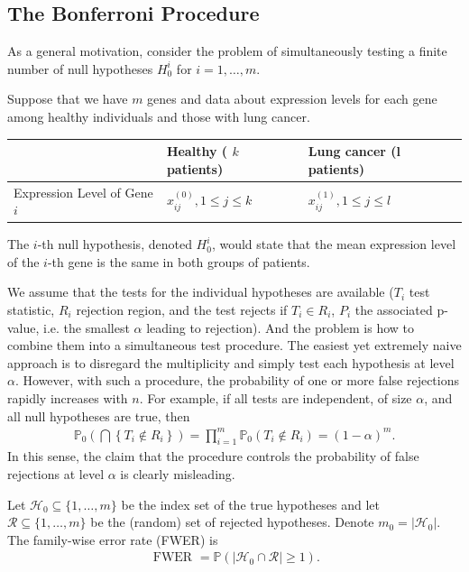 \subsection{The Bonferroni Procedure}
As a general motivation, consider the problem of simultaneously testing a finite number of null hypotheses $H_0^i$ for $i=1, \ldots, m$.
\begin{eg}
    Suppose that we have $m$ genes and data about expression levels for each gene among healthy individuals and those with lung cancer.
    
\begin{tabular}{l|l|l} 
& Healthy ( $k$ patients) & Lung cancer (l patients) \\
\hline Expression Level of Gene $i$ & $x_{i j}^{(0)}, 1 \leq j \leq k$ & $x_{i j}^{(1)}, 1 \leq j \leq l$
\end{tabular}

The $i$-th null hypothesis, denoted $H_0^i$, would state that the mean expression level of the $i$-th gene is the same in both groups of patients.
\end{eg}


We assume that the tests for the individual hypotheses are available ($T_i$ test statistic, $R_i$ rejection region, and the test rejects if $T_i \in R_i$, $P_i$ the associated p-value, i.e. the smallest $\alpha$ leading to rejection). And the problem is how to combine them into a simultaneous test procedure. The easiest yet extremely naive approach is to disregard the multiplicity and simply test each hypothesis at level $\alpha$. However, with such a procedure, the probability of one or more false rejections rapidly increases with $n$. For example, if all tests are independent, of size $\alpha$, and all null hypotheses are true, then
\begin{align*}
\mathbb{P}_0\left(\bigcap\left\{T_i \notin R_i\right\}\right)=\prod_{i=1}^m \mathbb{P}_0\left(T_i \notin R_i\right)=(1-\alpha)^m .
\end{align*}
In this sense, the claim that the procedure controls the probability of false rejections at level $\alpha$ is clearly misleading.
\begin{de}
    Let $\mathcal{H}_0 \subseteq\{1, \ldots, m\}$ be the index set of the true hypotheses and let $\mathcal{R} \subseteq\{1, \ldots, m\}$ be the (random) set of rejected hypotheses. Denote $m_0=\left|\mathcal{H}_0\right|$. The family-wise error rate (FWER) is
\begin{align*}
\text { FWER }=\mathbb{P}\left(\left|\mathcal{H}_0 \cap \mathcal{R}\right| \geq 1\right) .
\end{align*}
\end{de}



